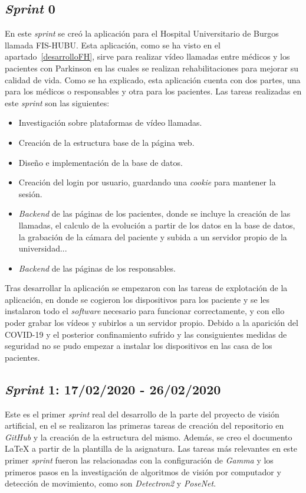 \subsection{\textit{Sprint} 0}
En este \textit{sprint} se creó la aplicación para el Hospital Universitario de Burgos llamada FIS-HUBU. Esta aplicación, como se ha visto en el apartado~\ref{desarrolloFH}, sirve para realizar vídeo llamadas entre médicos y los pacientes con Parkinson en las cuales se realizan rehabilitaciones para mejorar su calidad de vida. Como se ha explicado, esta aplicación cuenta con dos partes, una para los médicos o responsables y otra para los pacientes. Las tareas realizadas en este \textit{sprint} son las siguientes:
\begin{itemize}
	\item Investigación sobre plataformas de vídeo llamadas.
	\item Creación de la estructura base de la página web.
	\item Diseño e implementación de la base de datos.
	\item Creación del login por usuario, guardando una \textit{cookie} para mantener la sesión.
	\item \textit{Backend} de las páginas de los pacientes, donde se  incluye la creación de las llamadas, el calculo de la evolución a partir de los datos en la base de datos, la grabación de la cámara del paciente y subida a un servidor propio de la universidad...
	\item \textit{Backend} de las páginas de los responsables.
\end{itemize}

Tras desarrollar la aplicación se empezaron con las tareas de explotación de la aplicación, en donde se cogieron los dispositivos para los paciente y se les instalaron todo el \textit{software} necesario para funcionar correctamente, y con ello poder grabar los vídeos y subirlos a un servidor propio. Debido a la aparición del COVID-19 y el posterior confinamiento sufrido y las consiguientes medidas de seguridad no se pudo empezar a instalar los dispositivos en las casa de los pacientes.
\subsection{\textit{Sprint} 1: 17/02/2020 - 26/02/2020}
Este es el primer \textit{sprint} real del desarrollo de la parte del proyecto de visión artificial, en el se realizaron las primeras tareas de creación del repositorio en \textit{GitHub} y la creación de la estructura del mismo. Además, se creo el documento \LaTeX{} a partir de la plantilla de la asignatura. Las tareas más relevantes en este primer \textit{sprint} fueron las relacionadas con la configuración de \textit{Gamma} y los primeros pasos en la investigación de algoritmos de visión por computador y detección de movimiento, como son \textit{Detectron2} y \textit{PoseNet}.
